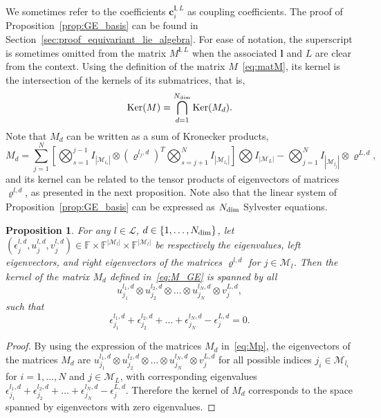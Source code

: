 \documentclass{article}
\newcommand{\vrho}[2]{\varrho^{#1}_{#2}}
\newcommand{\dd}{{d}}
\newcommand{\card}[1]{|{#1}|}
\newtheorem{proposition}[theorem]{Proposition}
\numberwithin{equation}{section}
\def\F{\mathbb{F}}
\def\bc{{\bm c}}
\def\bl{{\bm l}}
\def\calM{\mathcal{M}}
\def\calL{\mathcal{L}}
\def\MlL{{M}}
\def\Nat{{N}}
\begin{document}
We sometimes refer to the coefficients $\bc^{\bl,L}_i$ as coupling coefficients. The proof of Proposition~\ref{prop:GE_basis} can be found in Section~\ref{sec:proof_equivariant_lie_algebra}. For ease of notation, the superscript is sometimes omitted from the matrix $M^{\bl,L}$ when the associated $\bl$ and $L$ are clear from the context.
Using the definition of the matrix $\MlL$~\eqref{eq:matM}, its kernel is the intersection of the kernels of its submatrices, that is,
\begin{equation}
\label{eq:ker_inclusion}
    {\rm Ker}(M) = \bigcap_{d=1}^{N_{\rm dim}} {\rm Ker}(M_d).
\end{equation}
Note that $M_\dd$ can be written as a sum of Kronecker products, 
\begin{equation}
     M_\dd = \sum_{j=1}^\Nat 
    \left[ 
    \bigotimes_{s=1}^{j-1}I_{\card{\calM_{l_s}}}\otimes (\vrho{l_j,\dd}{})^T\bigotimes_{s=j+1}^{\Nat}I_{\card{\calM_{l_s}}}
    \right]
    \bigotimes I_{\card{\calM_L}} - \bigotimes_{j=1}^\Nat I_{\card{\calM_{l_j}}}\otimes \vrho{L,\dd}{},
    \label{eq:Mp}
\end{equation}
and its kernel can be related to the tensor products of eigenvectors of matrices $\vrho{l,\dd}{}$, as presented in the next proposition. 
Note also that the linear system of Proposition~\ref{prop:GE_basis} can be expressed as $N_{\rm dim}$ Sylvester equations.

\begin{proposition}
\label{prop:kernel_sum}
    For any $l\in \calL$, $d \in \{ 1, \ldots, N_{\rm dim} \}$, let $(\epsilon^{l,d}_j, u^{l,d}_j, v^{l,d}_j) \in \F \times \F^{|\calM_l|}\times \F^{|\calM_l|}$ be respectively the eigenvalues, left eigenvectors, and right eigenvectors  of the matrices $\vrho{l,\dd}{}$ for $j \in \calM_{l}$. Then the kernel of the matrix $M_d$ defined in~\eqref{eq:M_GE} is spanned by all
    \[
        u^{l_1,d}_{j_1} \otimes 
        u^{l_2,d}_{j_2} \otimes 
        \ldots 
        \otimes 
        u^{l_N,d}_{j_N} 
        \otimes v^{L,d}_{j},
    \]
    such that 
    \[
    \epsilon^{l_1,d}_{j_1} + \epsilon^{l_2,d}_{j_2} + \ldots 
    + \epsilon^{l_\Nat,d}_{j_\Nat}
    -  \epsilon^{L,d}_{j} = 0.
    \]
\end{proposition}


\begin{proof}
By using the expression of the matrices $M_d$ in~\eqref{eq:Mp}, the eigenvectors of the matrices $M_d$
are $u^{l_1,d}_{j_1} \otimes 
        u^{l_2,d}_{j_2} \otimes 
        \ldots 
        \otimes 
        u^{l_N,d}_{j_N} 
        \otimes v^{L,d}_{j}$
        for all possible indices $j_i \in \calM_{l_i}$ for $i=1,\ldots,\Nat$ and $j\in \calM_{L}$,
        with corresponding eigenvalues 
        $\epsilon^{l_1,d}_{j_1} + \epsilon^{l_2,d}_{j_2} + \ldots 
    + \epsilon^{l_\Nat,d}_{j_\Nat}
    -  \epsilon^{L,d}_{j}$.
    Therefore the kernel of $M_d$ corresponds to the space spanned by eigenvectors with zero eigenvalues.
\end{proof}
\end{document}
